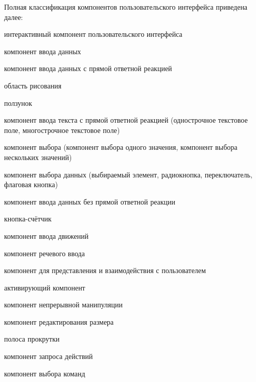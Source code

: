 Полная классификация компонентов пользовательского интерфейса приведена далее:
\begin{textitemize}
	\item интерактивный компонент пользовательского интерфейса
	\begin{textitemize}
		\item компонент ввода данных
		\begin{textitemize}
			\item компонент ввода данных с прямой ответной реакцией
			\begin{textitemize}
				\item область рисования
				\item ползунок
				\item компонент ввода текста с прямой ответной реакцией (однострочное текстовое поле, многострочное текстовое поле)
				\item компонент выбора (компонент выбора одного значения, компонент выбора нескольких значений)
				\item компонент выбора данных (выбираемый элемент, радиокнопка, переключатель, флаговая кнопка)
			\end{textitemize}
			\item компонент ввода данных без прямой ответной реакции
			\begin{textitemize}
				\item кнопка-счётчик
				\item компонент ввода движений
				\item компонент речевого ввода
			\end{textitemize}
		\end{textitemize}
		\item компонент для представления и взаимодействия с пользователем
		\begin{textitemize}
			\item активирующий компонент
			\item компонент непрерывной манипуляции
			\begin{textitemize}
				\item компонент редактирования размера
				\item полоса прокрутки
			\end{textitemize}
		\end{textitemize}
		\item компонент запроса действий
		\begin{textitemize}
			\item компонент выбора команд
			\begin{textitemize}

\end{textitemize}
\end{textitemize}
\end{textitemize}
\end{textitemize}
